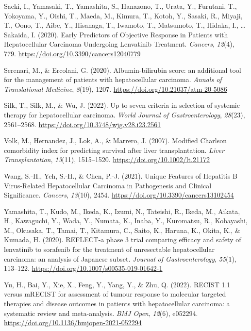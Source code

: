 \documentclass[
  indonesian,
]{report}
\newlength{\cslhangindent}
\newenvironment{CSLReferences}[2] %
 {\begin{list}{}{%
  \setlength{\itemindent}{0pt}
  \setlength{\leftmargin}{0pt}
  \setlength{\parsep}{0pt}
  \ifodd #1
   \setlength{\leftmargin}{\cslhangindent}
   \setlength{\itemindent}{-1\cslhangindent}
  \fi
  \setlength{\itemsep}{#2\baselineskip}}}
 {\end{list}}
\begin{document}
\begin{CSLReferences}{1}{0}
Saeki, I., Yamasaki, T., Yamashita, S., Hanazono, T., Urata, Y.,
Furutani, T., Yokoyama, Y., Oishi, T., Maeda, M., Kimura, T., Kotoh, Y.,
Sasaki, R., Miyaji, T., Oono, T., Aibe, Y., Hisanaga, T., Iwamoto, T.,
Matsumoto, T., Hidaka, I., \ldots{} Sakaida, I. (2020). Early
{Predictors} of {Objective} {Response} in {Patients} with
{Hepatocellular} {Carcinoma} {Undergoing} {Lenvatinib} {Treatment}.
\emph{Cancers}, \emph{12}(4), 779.
\url{https://doi.org/10.3390/cancers12040779}

Serenari, M., \& Ercolani, G. (2020). Albumin-bilirubin score: an
additional tool for the management of patients with hepatocellular
carcinoma. \emph{Annals of Translational Medicine}, \emph{8}(19), 1207.
\url{https://doi.org/10.21037/atm-20-5086}

Silk, T., Silk, M., \& Wu, J. (2022). Up to seven criteria in selection
of systemic therapy for hepatocellular carcinoma. \emph{World Journal of
Gastroenterology}, \emph{28}(23), 2561--2568.
\url{https://doi.org/10.3748/wjg.v28.i23.2561}

Volk, M., Hernandez, J., Lok, A., \& Marrero, J. (2007). Modified
{Charlson} comorbidity index for predicting survival after liver
transplantation. \emph{Liver Transplantation}, \emph{13}(11),
1515--1520. \url{https://doi.org/10.1002/lt.21172}

Wang, S.-H., Yeh, S.-H., \& Chen, P.-J. (2021). Unique {Features} of
{Hepatitis} {B} {Virus}-{Related} {Hepatocellular} {Carcinoma} in
{Pathogenesis} and {Clinical} {Significance}. \emph{Cancers},
\emph{13}(10), 2454. \url{https://doi.org/10.3390/cancers13102454}

Yamashita, T., Kudo, M., Ikeda, K., Izumi, N., Tateishi, R., Ikeda, M.,
Aikata, H., Kawaguchi, Y., Wada, Y., Numata, K., Inaba, Y., Kuromatsu,
R., Kobayashi, M., Okusaka, T., Tamai, T., Kitamura, C., Saito, K.,
Haruna, K., Okita, K., \& Kumada, H. (2020). {REFLECT}-a phase 3 trial
comparing efficacy and safety of lenvatinib to sorafenib for the
treatment of unresectable hepatocellular carcinoma: an analysis of
{Japanese} subset. \emph{Journal of Gastroenterology}, \emph{55}(1),
113--122. \url{https://doi.org/10.1007/s00535-019-01642-1}

Yu, H., Bai, Y., Xie, X., Feng, Y., Yang, Y., \& Zhu, Q. (2022).
{RECIST} 1.1 versus {mRECIST} for assessment of tumour response to
molecular targeted therapies and disease outcomes in patients with
hepatocellular carcinoma: a systematic review and meta-analysis.
\emph{BMJ Open}, \emph{12}(6), e052294.
\url{https://doi.org/10.1136/bmjopen-2021-052294}

\end{CSLReferences}
\end{document}
